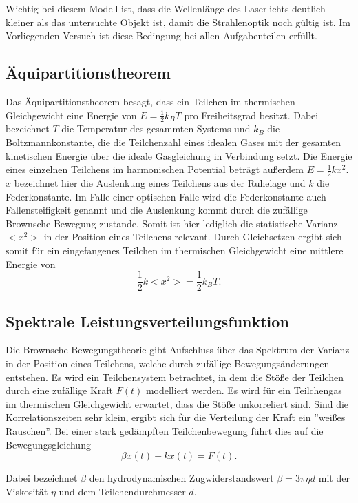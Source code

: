 Wichtig bei diesem Modell ist, dass die Wellenlänge des Laserlichts
deutlich kleiner als das untersuchte Objekt ist, damit die Strahlenoptik 
noch gültig ist. Im Vorliegenden Versuch ist diese Bedingung bei allen Aufgabenteilen erfüllt. 

\subsection{Äquipartitionstheorem}
Das Äquipartitionstheorem besagt, dass ein Teilchen im thermischen Gleichgewicht 
eine Energie von $E=\frac{1}{2}k_B T$ pro Freiheitsgrad besitzt. Dabei bezeichnet $T$ die Temperatur des gesammten Systems und $k_B$ die 
Boltzmannkonstante, die die Teilchenzahl eines idealen Gases mit der gesamten kinetischen Energie über die ideale Gasgleichung in Verbindung setzt.
Die Energie eines einzelnen Teilchens im harmonischen Potential beträgt außerdem $E=\frac{1}{2}k x^2$. $x$ bezeichnet hier die Auslenkung eines Teilchens aus der
Ruhelage und $k$ die Federkonstante. Im Falle einer optischen Falle wird die Federkonstante auch Fallensteifigkeit genannt und die 
Auslenkung kommt durch die zufällige Brownsche Bewegung zustande. Somit ist hier lediglich die statistische Varianz $<\!\!x^2\!\!>$ in der Position eines Teilchens relevant.
Durch Gleichsetzen ergibt sich somit für ein eingefangenes Teilchen im thermischen Gleichgewicht eine mittlere Energie von
\begin{equation}
    \frac{1}{2}k <\!\!x^2\!\!> = \frac{1}{2}k_B T.
\end{equation}
\subsection{Spektrale Leistungsverteilungsfunktion}
Die Brownsche Bewegungstheorie gibt 
Aufschluss über das Spektrum der Varianz in der Position eines Teilchens,
welche durch zufällige Bewegungsänderungen entstehen.
Es wird ein Teilchensystem betrachtet, in dem die Stöße der Teilchen durch eine zufällige
Kraft $F(t)$ modelliert werden. Es wird für ein Teilchengas im thermischen Gleichgewicht erwartet, 
dass die Stöße unkorreliert sind. Sind die Korrelationszeiten sehr 
klein, ergibt sich für die Verteilung der
Kraft ein ”weißes Rauschen”. Bei einer stark gedämpften
Teilchenbewegung führt dies auf die Bewegungsgleichung
\begin{equation}
    \beta \dot{x}(t) + k x(t) = F(t).
\end{equation}


Dabei bezeichnet $\beta$ den hydrodynamischen Zugwiderstandswert $\beta = 3 \pi \eta d$
mit der Viskosität $\eta$ und dem Teilchendurchmesser $d$.


